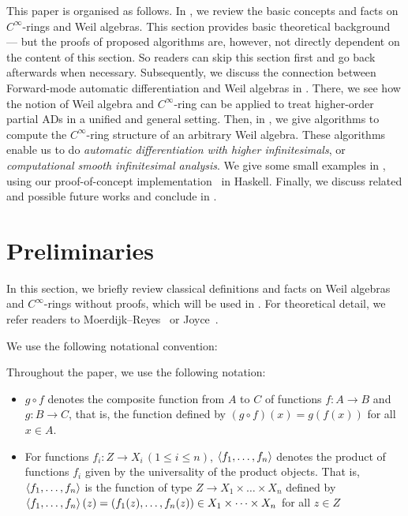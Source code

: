 This paper is organised as follows.
In , we review the basic concepts and facts on $C^\infty$-rings and Weil algebras.
This section provides basic theoretical background --- but the proofs of proposed algorithms are, however, not directly dependent on the content of this section.
So readers can skip this section first and go back afterwards when necessary.
Subsequently, we discuss the connection between Forward-mode automatic differentiation and Weil algebras in .
There, we see how the notion of Weil algebra and $C^\infty$-ring can be applied to treat higher-order partial ADs in a unified and general setting.
Then, in , we give algorithms to compute the $C^\infty$-ring structure of an arbitrary Weil algebra. These algorithms enable us to do \emph{automatic differentiation with higher infinitesimals}, or \emph{computational smooth infinitesimal analysis}.
We give some small examples in , using our proof-of-concept implementation~\cite{Ishii:2020aa} in Haskell.
Finally, we discuss related and possible future works and conclude in .

\section{Preliminaries}\label{sec:prel}
In this section, we briefly review classical definitions and facts on Weil algebras and $C^\infty$-rings without proofs, which will be used in .
For theoretical detail, we refer readers to Moerdijk--Reyes~\cite[Chapters I and II]{Moerdijk:1991aa} or Joyce~\cite{joyce2016algebraic}.

We use the following notational convention:
\begin{definition}[Notation]
  Throughout the paper, we use the following notation:
  \begin{itemize}
    \item
    $g \circ f$ denotes the composite function from $A$ to $C$ of functions $f: A \to B$ and $g: B \to C$, that is, the function defined by $(g \circ f)(x) = g(f(x))$ for all $x \in A$.
    \item For functions $f_i: Z \to X_i\,(1 \leq i \leq n)$,
    $\braket{f_1, \dots, f_n}$ denotes the product of functions $f_i$ given by the universality of the product objects.
    That is, $\braket{f_1, \dots, f_n}$ is the function of type $Z \to X_1 \times \dots \times X_n$ defined by $\braket{f_1, \dots, f_n}(z) = (f_1(z), \dots, f_n(z)) \in X_1 \times \dots \times X_n$ for all $z \in Z$
  \end{itemize}
\end{definition}

